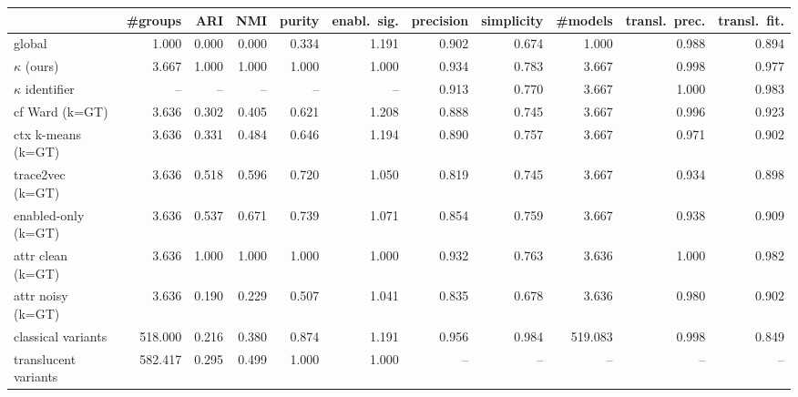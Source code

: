 \begin{tabular}{lrrrrrrrrrr}
\toprule
 & \#groups & ARI & NMI & purity & enabl.\ sig. & precision & simplicity & \#models & transl.\ prec. & transl.\ fit. \\
\midrule
global & 1.000 & 0.000 & 0.000 & 0.334 & 1.191 & 0.902 & 0.674 & 1.000 & 0.988 & 0.894 \\
$\kappa$ (ours) & 3.667 & 1.000 & 1.000 & 1.000 & 1.000 & 0.934 & 0.783 & 3.667 & 0.998 & 0.977 \\
$\kappa$ identifier & -- & -- & -- & -- & -- & 0.913 & 0.770 & 3.667 & 1.000 & 0.983 \\
cf Ward (k=GT) & 3.636 & 0.302 & 0.405 & 0.621 & 1.208 & 0.888 & 0.745 & 3.667 & 0.996 & 0.923 \\
ctx k-means (k=GT) & 3.636 & 0.331 & 0.484 & 0.646 & 1.194 & 0.890 & 0.757 & 3.667 & 0.971 & 0.902 \\
trace2vec (k=GT) & 3.636 & 0.518 & 0.596 & 0.720 & 1.050 & 0.819 & 0.745 & 3.667 & 0.934 & 0.898 \\
enabled-only (k=GT) & 3.636 & 0.537 & 0.671 & 0.739 & 1.071 & 0.854 & 0.759 & 3.667 & 0.938 & 0.909 \\
attr clean (k=GT) & 3.636 & 1.000 & 1.000 & 1.000 & 1.000 & 0.932 & 0.763 & 3.636 & 1.000 & 0.982 \\
attr noisy (k=GT) & 3.636 & 0.190 & 0.229 & 0.507 & 1.041 & 0.835 & 0.678 & 3.636 & 0.980 & 0.902 \\
classical variants & 518.000 & 0.216 & 0.380 & 0.874 & 1.191 & 0.956 & 0.984 & 519.083 & 0.998 & 0.849 \\
translucent variants & 582.417 & 0.295 & 0.499 & 1.000 & 1.000 & -- & -- & -- & -- & -- \\
\bottomrule
\end{tabular}
